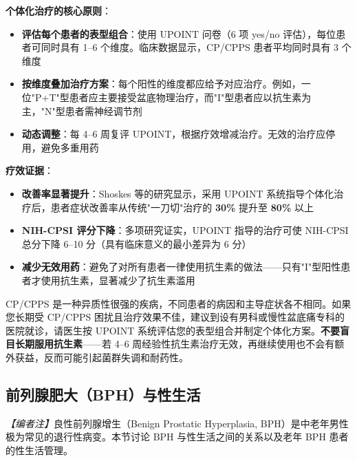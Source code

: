 \vspace{0.5em}
\noindent\textbf{个体化治疗的核心原则}：

\begin{itemize}[leftmargin=2cm]
	\item \textbf{评估每个患者的表型组合}：使用 UPOINT 问卷（6 项 yes/no 评估），每位患者可同时具有 1--6 个维度。临床数据显示，CP/CPPS 患者平均同时具有 3 个维度
	\item \textbf{按维度叠加治疗方案}：每个阳性的维度都应给予对应治疗。例如，一位"P+T"型患者应主要接受盆底物理治疗，而"I"型患者应以抗生素为主，"N"型患者需神经调节剂
	\item \textbf{动态调整}：每 4--6 周复评 UPOINT，根据疗效增减治疗。无效的治疗应停用，避免多重用药
\end{itemize}

\vspace{0.5em}
\noindent\textbf{疗效证据}：

\begin{itemize}[leftmargin=2cm]
	\item \textbf{改善率显著提升}：Shoskes 等的研究显示，采用 UPOINT 系统指导个体化治疗后，患者症状改善率从传统"一刀切"治疗的 \textbf{30\%} 提升至 \textbf{80\%} 以上
	\item \textbf{NIH-CPSI 评分下降}：多项研究证实，UPOINT 指导的治疗可使 NIH-CPSI 总分下降 6--10 分（具有临床意义的最小差异为 6 分）
	\item \textbf{减少无效用药}：避免了对所有患者一律使用抗生素的做法——只有"I"型阳性患者才使用抗生素，显著减少了抗生素滥用
\end{itemize}

\begin{tcolorbox}[colback=pink!5!white,colframe=red!50!black,title=贴心小叮咛]
CP/CPPS 是一种异质性很强的疾病，不同患者的病因和主导症状各不相同。如果您长期受 CP/CPPS 困扰且治疗效果不佳，建议到设有男科或慢性盆底痛专科的医院就诊，请医生按 UPOINT 系统评估您的表型组合并制定个体化方案。\textbf{不要盲目长期服用抗生素}——若 4--6 周经验性抗生素治疗无效，再继续使用也不会有额外获益，反而可能引起菌群失调和耐药性。
\end{tcolorbox}

\subsection{前列腺肥大（BPH）与性生活}

\noindent\textit{【编者注】}良性前列腺增生（Benign Prostatic Hyperplasia, BPH）是中老年男性极为常见的退行性病变。本节讨论 BPH 与性生活之间的关系以及老年 BPH 患者的性生活管理。

